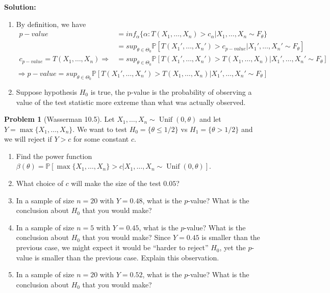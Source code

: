 \documentclass[13pt]{article}
\theoremstyle{definition}
\newtheorem{problem}[theorem]{Problem}
\newenvironment{solution}
{\color{C2}\begin{framed}\begingroup\textbf{Solution:} }
  {\endgroup\end{framed}}
\theoremstyle{remark}
\newcommand{\PP}{\mathbb{P}}
\begin{document}
\begin{solution}
\begin{enumerate}[label=(\alph*),topsep=0pt]
    \item By definition, we have
    \begin{align*}
    p-value &= inf_{\alpha}\{\alpha: T(X_1, \ldots, X_n) >c_{\alpha}|X_1, \ldots, X_n \sim F_\theta\}\\
    &= sup_{\theta\in \Theta_0}\PP[ T(X_1', \ldots, X_n') >c_{p-value}|X_1', \ldots, X_n' \sim F_\theta]\\
   c_{p-value}=T(X_1, \ldots, X_n) \Longrightarrow &= sup_{\theta\in \Theta_0}\PP[ T(X_1', \ldots, X_n') >T(X_1, \ldots, X_n)|X_1', \ldots, X_n' \sim F_\theta]\\
\end{align*}
\[\Longrightarrow p-value =sup_{\theta\in \Theta_0}\PP[ T(X_1', \ldots, X_n') >T(X_1, \ldots, X_n)|X_1', \ldots, X_n' \sim F_\theta]\]
    \item Suppose hypothesis $H_0$ is true, the p-value is the probability of observing a value of the test statistic more extreme than what was actually observed.
    \end{enumerate}
\end{solution}

\begin{problem}[Wasserman 10.5]
    Let $X_1, \ldots, X_n\sim \operatorname{Unif}(0,\theta)$ and let $Y=\max\{X_1, \ldots, X_n\}$.
    We want to test $H_0 = \{ \theta  \leq 1/2 \}$ vs $H_1 = \{\theta>1/2\}$ and we will reject if $Y>c$ for some constant $c$.
    \begin{enumerate}[label=(\alph*),topsep=0pt]
        \item Find the power function $\beta(\theta) = \PP[\max\{X_1, \ldots, X_n\} > c | X_1, \ldots, X_n \sim \operatorname{Unif}(0,\theta) ]$.
        \item What choice of $c$ will make the size of the test $0.05$?
        \item In a sample of size $n=20$ with $Y=0.48$, what is the $p$-value? What is the conclusion about $H_0$ that you would make?
        \item In a sample of size $n=5$ with $Y=0.45$, what is the $p$-value? What is the conclusion about $H_0$ that you would make? Since $Y=0.45$ is smaller than the previous case, we might expect it would be ``harder to reject'' $H_0$, yet the $p$-value is smaller than the previous case. 
            Explain this observation. 
        \item In a sample of size $n=20$ with $Y=0.52$, what is the $p$-value? What is the conclusion about $H_0$ that you would make?
    \end{enumerate}

\end{problem}
\end{document}
